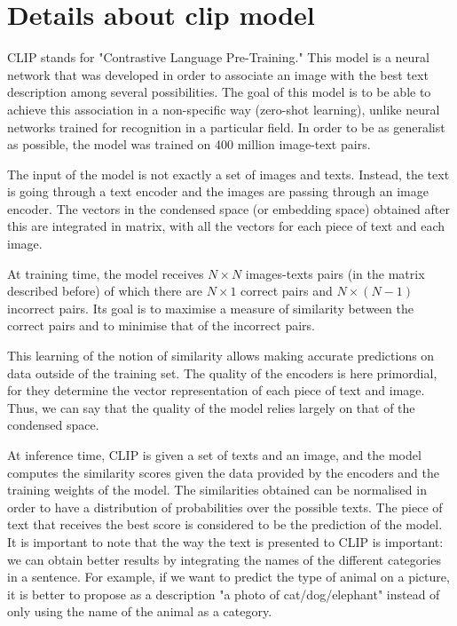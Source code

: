 \documentclass{article}
\begin{document}
\begin{appendix}
\begin{multicols}{2}
\end{multicols}

\clearpage

\section{Details about \gls{clip} model} \label{app:more-CLIP}

\begin{multicols}{2}

CLIP stands for "Contrastive Language Pre-Training." This model is a neural network that was developed in order to associate an image with the best text description among several possibilities. The goal of this model is to be able to achieve this association in a non-specific way (zero-shot learning), unlike neural networks trained for recognition in a particular field. In order to be as generalist as possible, the model was trained on 400 million image-text pairs. 

The input of the model is not exactly a set of images and texts. Instead, the text is going through a text encoder and the images are passing through an image encoder. The vectors in the condensed space (or embedding space) obtained after this are integrated in matrix, with all the vectors for each piece of text and each image.

At training time, the model receives $N \times N$ images-texts pairs (in the matrix described before) of which there are $N \times 1$ correct pairs and $N\times(N-1)$ incorrect pairs. Its goal is to maximise a measure of similarity between the correct pairs and to minimise that of the incorrect pairs. 

This learning of the notion of similarity allows making accurate predictions on data outside of the training set. The quality of the encoders is here primordial, for they determine the vector representation of each piece of text and image. Thus, we can say that the quality of the model relies largely on that of the condensed space. 

At inference time, CLIP is given a set of texts and an image, and the model computes the similarity scores given the data provided by the encoders and the training weights of the model. The similarities obtained can be normalised in order to have a distribution of probabilities over the possible texts. The piece of text that receives the best score is considered to be the prediction of the model. It is important to note that the way the text is presented to CLIP is important: we can obtain better results by integrating the names of the different categories in a sentence. For example, if we want to predict the type of animal on a picture, it is better to propose as a description "a photo of cat/dog/elephant" instead of only using the name of the animal as a category. 


\end{multicols}
\end{appendix}
\end{document}
